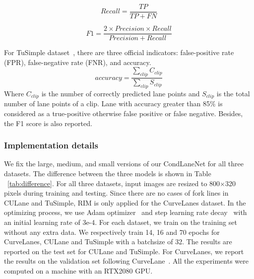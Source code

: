 \documentclass[10pt,twocolumn,letterpaper]{article}
\begin{document}
\begin{equation}
    \displaystyle
Recall=\frac{TP}{TP+FN}
\label{re} 
\end{equation}

\begin{equation}
    \displaystyle
F1=\frac{2\times Precision\times Recall}{Precision+Recall}
\label{f1} 
\end{equation}

For TuSimple dataset~\cite{c.elmohamed}, there are three official indicators: false-positive rate (FPR), false-negative rate (FNR), and accuracy.
\begin{equation}
    \displaystyle
accuracy = \frac{\sum_{clip} C_{clip}}{\sum_{clip} S_{clip}}
\end{equation}Where \(C_{clip}\) is the number of correctly predicted lane points and \(S_{clip}\) is the total number of lane points of a clip. 
Lane with accuracy greater than 85$\%$ is considered as a true-positive otherwise false positive or false negative. Besides, the F1 score is also reported.

\subsubsection{Implementation details}

We fix the large, medium, and small versions of our CondLaneNet for all three datasets. The difference between the three models is shown in Table ~\ref{tab:difference}.
For all three datasets, input images are resized to 800\(\times\)320 pixels during training and testing. Since there are no cases of fork lines in CULane and TuSimple, RIM is only applied for the CurveLanes dataset. In the optimizing process, we use Adam optimizer~\cite{kingma2014adam} and step learning rate decay~\cite{loshchilov2017decoupled} with an initial learning rate of 3e-4. For each dataset, we train on the training set without any extra data. We respectively train 14, 16 and 70 epochs for CurveLanes, CULane and TuSimple with a batchsize of 32.
The results are reported on the test set for CULane and TuSimple. For CurveLanes, we report the results on the validation set following CurveLane~\cite{li2020curvelane}. All the experiments were computed on a machine with an RTX2080 GPU.
\begin{table}[!h]
\centering
{}
\caption{Difference of different versions of our CondLaneNet.}
\label{tab:difference}
\end{table}
\end{document}
